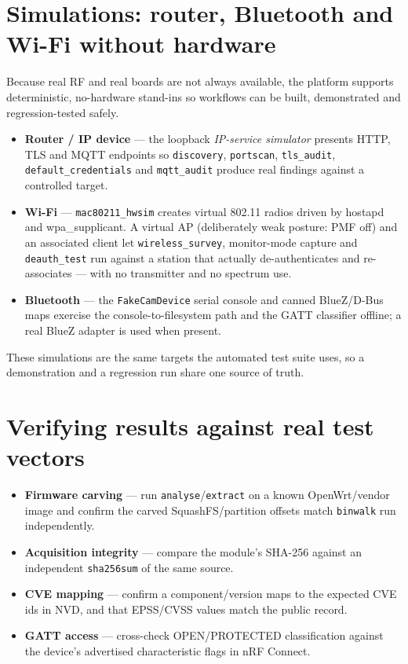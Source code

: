 \documentclass[11pt]{article}
\newif\ifintable\intablefalse
\newcommand{\code}[1]{\ifintable\texttt{#1}\else{\small\colorbox{codebg}{\texttt{#1}}}\fi}
\begin{document}
\section{Simulations: router, Bluetooth and Wi-Fi without hardware}
Because real RF and real boards are not always available, the platform supports
deterministic, no-hardware stand-ins so workflows can be built, demonstrated and
regression-tested safely.
\begin{itemize}
  \item \textbf{Router / IP device} --- the loopback \emph{IP-service simulator}
  presents HTTP, TLS and MQTT endpoints so \code{discovery}, \code{portscan},
  \code{tls\_audit}, \code{default\_credentials} and \code{mqtt\_audit} produce
  real findings against a controlled target.
  \item \textbf{Wi-Fi} --- \code{mac80211\_hwsim} creates virtual 802.11 radios
  driven by hostapd and wpa\_supplicant. A virtual AP (deliberately weak posture:
  PMF off) and an associated client let \code{wireless\_survey}, monitor-mode
  capture and \code{deauth\_test} run against a station that actually
  de-authenticates and re-associates --- with no transmitter and no spectrum use.
  \item \textbf{Bluetooth} --- the \code{FakeCamDevice} serial console and
  canned BlueZ/D-Bus maps exercise the console-to-filesystem path and the GATT
  classifier offline; a real BlueZ adapter is used when present.
\end{itemize}
These simulations are the same targets the automated test suite uses, so a
demonstration and a regression run share one source of truth.

\section{Verifying results against real test vectors}
\begin{itemize}
  \item \textbf{Firmware carving} --- run \code{analyse}/\code{extract} on a known
  OpenWrt/vendor image and confirm the carved SquashFS/partition offsets match
  \texttt{binwalk} run independently.
  \item \textbf{Acquisition integrity} --- compare the module's SHA-256 against an
  independent \texttt{sha256sum} of the same source.
  \item \textbf{CVE mapping} --- confirm a component/version maps to the expected
  CVE ids in NVD, and that EPSS/CVSS values match the public record.
  \item \textbf{GATT access} --- cross-check OPEN/PROTECTED classification against
  the device's advertised characteristic flags in nRF Connect.
\end{itemize}
\end{document}
